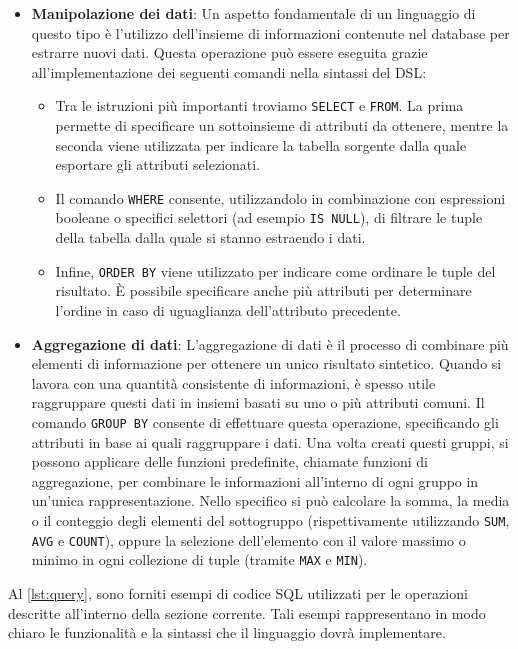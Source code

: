 \documentclass[12pt,a4paper,openright,twoside]{book}
\begin{document}
\begin{itemize}
    \item \textbf{Manipolazione dei dati}: Un aspetto fondamentale di un linguaggio di questo tipo è l’utilizzo dell’insieme di 
    informazioni contenute nel database per estrarre nuovi dati. Questa operazione può essere eseguita grazie all’implementazione dei 
    seguenti comandi nella sintassi del \ac{DSL}:

    \begin{itemize}
        \item Tra le istruzioni più importanti troviamo \texttt{SELECT} e \texttt{FROM}. La prima permette di specificare un sottoinsieme 
        di attributi da ottenere, mentre la seconda viene utilizzata per indicare la tabella sorgente dalla quale esportare gli attributi 
        selezionati.
        \item Il comando \texttt{WHERE} consente, utilizzandolo in combinazione con espressioni booleane o specifici selettori (ad esempio 
        \texttt{IS NULL}), di filtrare le tuple della tabella dalla quale si stanno estraendo i dati.
        \item Infine, \texttt{ORDER BY} viene utilizzato per indicare come ordinare le tuple del risultato. È possibile specificare anche 
        più attributi per determinare l’ordine in caso di uguaglianza dell’attributo precedente.
    \end{itemize}

    \item \textbf{Aggregazione di dati}: L’aggregazione di dati è il processo di combinare più elementi di informazione per ottenere un unico 
    risultato sintetico. Quando si lavora con una quantità consistente di informazioni, è spesso utile raggruppare questi dati in insiemi 
    basati su uno o più attributi comuni. Il comando \texttt{GROUP BY} consente di effettuare questa operazione, specificando gli attributi
    in base ai quali raggruppare i dati. Una volta creati questi gruppi, si possono applicare delle funzioni predefinite, chiamate funzioni
    di aggregazione, per combinare le informazioni all’interno di ogni gruppo in un’unica rappresentazione. Nello specifico si può calcolare 
    la somma, la media o il conteggio degli elementi del sottogruppo (rispettivamente utilizzando \texttt{SUM}, \texttt{AVG} e \texttt{COUNT}), 
    oppure la selezione dell’elemento con il valore massimo o minimo in ogni collezione di tuple (tramite \texttt{MAX} e \texttt{MIN}).
\end{itemize}

Al \cref{lst:query}, sono forniti esempi di codice SQL utilizzati per le operazioni descritte all'interno della sezione corrente. Tali esempi 
rappresentano in modo chiaro le funzionalità e la sintassi che il linguaggio dovrà implementare.
\end{document}
